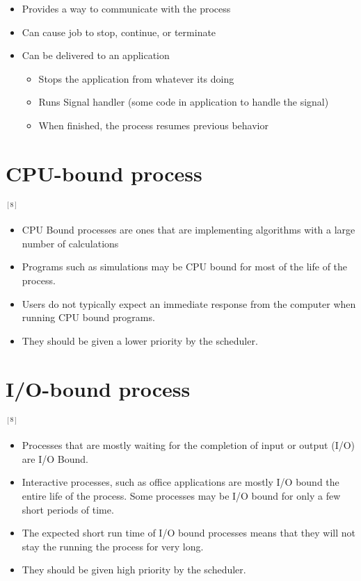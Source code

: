 \documentclass[12pt]{article}
\begin{document}
\begin{itemize}
    \item Provides a way to communicate with the process
    \item Can cause job to stop, continue, or terminate
    \item Can be delivered to an application

    \begin{itemize}
        \item Stops the application from whatever its doing
        \item Runs Signal handler (some code in application to handle the signal)
        \item When finished, the process resumes previous behavior
    \end{itemize}
\end{itemize}

\section{CPU-bound process} $^{[8]}$

\begin{itemize}
    \item CPU Bound processes are ones that are implementing algorithms
    with a large number of calculations
    \item Programs such as simulations may be CPU bound for most of the life of the process.
    \item Users do not typically expect an immediate response from the computer when running CPU bound programs.
    \item They should be given a lower priority by the scheduler.
\end{itemize}
\section{I/O-bound process} $^{[8]}$

\begin{itemize}
    \item Processes that are mostly waiting for the completion of input or output (I/O) are I/O Bound.
    \item Interactive processes, such as office applications are mostly I/O bound the entire life of the process. Some processes may be I/O bound for only a few short periods of time.
    \item The expected short run time of I/O bound processes means that they will not stay the running the process for very long.
    \item They should be given high priority by the scheduler.
\end{itemize}
\end{document}
